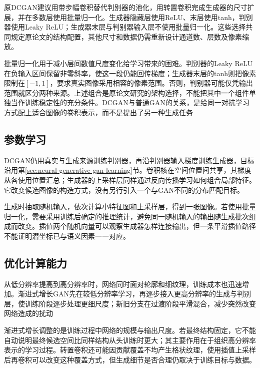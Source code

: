 原DCGAN建议用带步幅卷积替代判别器的池化，用转置卷积完成生成器的尺寸扩展，并在多数层使用批量归一化。生成器隐藏层使用ReLU、末层使用tanh，判别器使用Leaky ReLU；生成器末层与判别器输入层不使用批量归一化。这些选择共同规定原论文的结构配置，其他尺寸和数据仍需重新设计通道数、层数及像素缩放。

批量归一化用于减小层间数值尺度变化给学习带来的困难。判别器的Leaky ReLU在负输入区间保留非零斜率，使这一段仍能回传梯度；生成器末层的tanh则把像素限制在$[-1,1]$，要求真实图像采用相容的像素范围。否则，判别器可能仅凭输出范围就区分两种来源。上述组合是原论文研究的架构选择，不能把其中一个组件单独当作训练稳定性的充分条件。DCGAN与普通GAN的关系，是给同一对抗学习方式配上适合图像的卷积表示，而不是提出了另一种生成任务

\subsection{参数学习}
\label{sec:neural-generative-dcgan-learning}

DCGAN仍用真实与生成来源训练判别器，再沿判别器输入梯度训练生成器，目标沿用第\ref{sec:neural-generative-gan-learning}节。卷积核在空间位置间共享，其梯度从各使用位置汇总；生成器的上采样层同样通过反向传播学习如何组合局部特征。它改变候选图像的构造方式，没有另行引入一个与GAN不同的分布匹配目标。

生成时抽取随机输入，依次计算小特征图和上采样层，得到一张图像。若使用批量归一化，需要采用训练后确定的推理统计，避免同一随机输入的输出随生成批次组成而改变。插值两个随机向量可以观察生成器怎样连接输出，但一条平滑插值路径不能证明潜坐标已与语义因素一一对应。

\subsection{优化计算能力}
\label{sec:neural-generative-dcgan-computation-extension}

从低分辨率提高到高分辨率时，网络同时面对轮廓和细纹理，训练成本也迅速增加。渐进式增长GAN先在较低分辨率学习，再逐步接入更高分辨率的生成与判别层，使训练阶段逐步处理更细尺度；新旧分支在过渡阶段平滑混合，减少突然改变网络造成的扰动

渐进式增长调整的是训练过程中网络的规模与输出尺度。若最终结构固定，它不能自动说明最终候选空间比同样结构从头训练时更大；其主要作用在于组织高分辨率表示的学习过程。转置卷积还可能因贡献覆盖不均产生格状纹理，使用插值上采样后再卷积可以改变这种覆盖方式，但生成细节是否合理仍取决于训练目标与数据。

